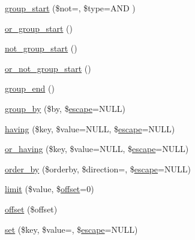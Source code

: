 \begin{DoxyCompactItemize}
\item 
\mbox{\hyperlink{class_c_i___d_b__query__builder_a0ad001f7f7d1a41fdee4a85b4f7db9b4}{group\+\_\+start}} (\$not=\textquotesingle{}\textquotesingle{}, \$type=\textquotesingle{}A\+ND \textquotesingle{})
\item 
\mbox{\hyperlink{class_c_i___d_b__query__builder_a80d5e4a0d8f2d0f202e8df6816865838}{or\+\_\+group\+\_\+start}} ()
\item 
\mbox{\hyperlink{class_c_i___d_b__query__builder_ae0b543e6db440c4a717714b5d5782e7a}{not\+\_\+group\+\_\+start}} ()
\item 
\mbox{\hyperlink{class_c_i___d_b__query__builder_a16a0c2a5f37a7be4c487670650d13faf}{or\+\_\+not\+\_\+group\+\_\+start}} ()
\item 
\mbox{\hyperlink{class_c_i___d_b__query__builder_ad97adc35e18afc9d4f26e0f568cdc6ed}{group\+\_\+end}} ()
\item 
\mbox{\hyperlink{class_c_i___d_b__query__builder_a111cc822f85357c4cfe37886e6315dce}{group\+\_\+by}} (\$by, \$\mbox{\hyperlink{class_c_i___d_b__driver_ac8f37ca5703d4558c732e692194f8cd6}{escape}}=N\+U\+LL)
\item 
\mbox{\hyperlink{class_c_i___d_b__query__builder_af19efb51311e6f648a0035a0f94fceb6}{having}} (\$key, \$value=N\+U\+LL, \$\mbox{\hyperlink{class_c_i___d_b__driver_ac8f37ca5703d4558c732e692194f8cd6}{escape}}=N\+U\+LL)
\item 
\mbox{\hyperlink{class_c_i___d_b__query__builder_a14528cda8dcca86ebb9b597d9c8d1c14}{or\+\_\+having}} (\$key, \$value=N\+U\+LL, \$\mbox{\hyperlink{class_c_i___d_b__driver_ac8f37ca5703d4558c732e692194f8cd6}{escape}}=N\+U\+LL)
\item 
\mbox{\hyperlink{class_c_i___d_b__query__builder_a6d1ce6a3b22187165ce7d710ce91841d}{order\+\_\+by}} (\$orderby, \$direction=\textquotesingle{}\textquotesingle{}, \$\mbox{\hyperlink{class_c_i___d_b__driver_ac8f37ca5703d4558c732e692194f8cd6}{escape}}=N\+U\+LL)
\item 
\mbox{\hyperlink{class_c_i___d_b__query__builder_a875b0d4703f176c36e771d728a9a04a0}{limit}} (\$value, \$\mbox{\hyperlink{class_c_i___d_b__query__builder_afd31b65425a2b5cf30711bf29e1b1851}{offset}}=0)
\item 
\mbox{\hyperlink{class_c_i___d_b__query__builder_afd31b65425a2b5cf30711bf29e1b1851}{offset}} (\$offset)
\item 
\mbox{\hyperlink{class_c_i___d_b__query__builder_a1589c46344f3a216a129cf65659b117c}{set}} (\$key, \$value=\textquotesingle{}\textquotesingle{}, \$\mbox{\hyperlink{class_c_i___d_b__driver_ac8f37ca5703d4558c732e692194f8cd6}{escape}}=N\+U\+LL)

\end{DoxyCompactItemize}
